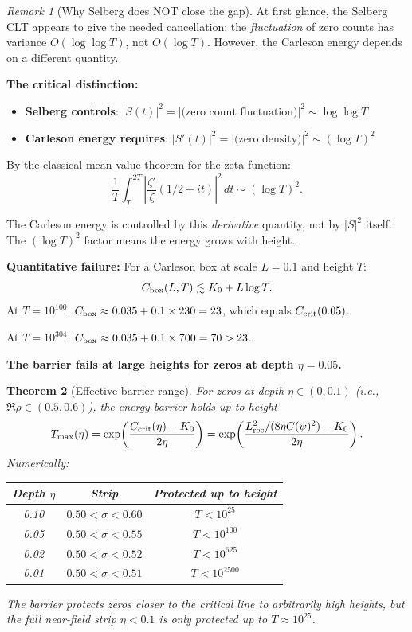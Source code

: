 \documentclass[11pt]{article}
\newtheorem{theorem}{Theorem}
\theoremstyle{definition}
\theoremstyle{remark}
\newtheorem{remark}[theorem]{Remark}
\theoremstyle{definition}
\begin{document}
\begin{remark}[Why Selberg does NOT close the gap]\label{rem:selberg-gap}
At first glance, the Selberg CLT appears to give the needed cancellation: the \emph{fluctuation} of zero counts has variance $O(\log\log T)$, not $O(\log T)$. However, the Carleson energy depends on a different quantity.

\textbf{The critical distinction:}
\begin{itemize}
\item \textbf{Selberg controls}: $|S(t)|^2 = |\text{(zero count fluctuation)}|^2 \sim \log\log T$
\item \textbf{Carleson energy requires}: $|S'(t)|^2 = |\text{(zero density)}|^2 \sim (\log T)^2$
\end{itemize}

By the classical mean-value theorem for the zeta function:
\[
  \frac{1}{T}\int_T^{2T} \left|\frac{\zeta'}{\zeta}(1/2+it)\right|^2\,dt \sim (\log T)^2.
\]

The Carleson energy is controlled by this \emph{derivative} quantity, not by $|S|^2$ itself. The $(\log T)^2$ factor means the energy grows with height.

\textbf{Quantitative failure:} For a Carleson box at scale $L = 0.1$ and height $T$:
\[
  C_{\rm box}(L, T) \lesssim K_0 + L\log T.
\]
At $T = 10^{100}$: $C_{\rm box} \approx 0.035 + 0.1 \times 230 = 23$, which equals $C_{\rm crit}(0.05)$.

At $T = 10^{304}$: $C_{\rm box} \approx 0.035 + 0.1 \times 700 = 70 > 23$.

\textbf{The barrier fails at large heights for zeros at depth $\eta = 0.05$.}
\end{remark}

\begin{theorem}[Effective barrier range]\label{thm:effective-barrier}
For zeros at depth $\eta \in (0, 0.1)$ (i.e., $\Re\rho \in (0.5, 0.6)$), the energy barrier holds up to height
\[
  T_{\max}(\eta) = \exp\!\left(\frac{C_{\rm crit}(\eta) - K_0}{2\eta}\right) = \exp\!\left(\frac{L_{\rm rec}^2/(8\eta C(\psi)^2) - K_0}{2\eta}\right).
\]
Numerically:
\begin{center}
\begin{tabular}{ccc}
\textbf{Depth $\eta$} & \textbf{Strip} & \textbf{Protected up to height} \\
\hline
0.10 & $0.50 < \sigma < 0.60$ & $T < 10^{25}$ \\
0.05 & $0.50 < \sigma < 0.55$ & $T < 10^{100}$ \\
0.02 & $0.50 < \sigma < 0.52$ & $T < 10^{625}$ \\
0.01 & $0.50 < \sigma < 0.51$ & $T < 10^{2500}$ \\
\end{tabular}
\end{center}
The barrier protects zeros closer to the critical line to arbitrarily high heights, but the full near-field strip $\eta < 0.1$ is only protected up to $T \approx 10^{25}$.
\end{theorem}
\end{document}
